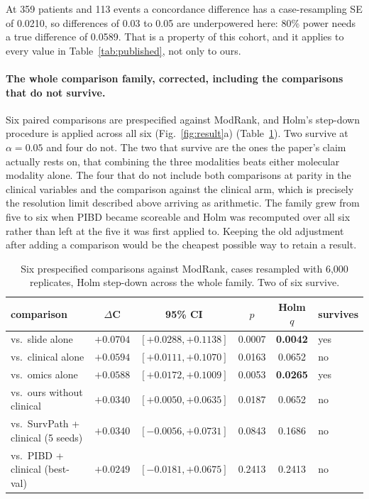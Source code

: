 \documentclass[unnumsec,webpdf,contemporary,large]{oup-authoring-template}
\begin{document}
At 359 patients and 113 events a concordance difference has a case-resampling SE of 0.0210, so
differences of 0.03 to 0.05 are underpowered here: 80\% power needs a true difference of 0.0589.
That is a property of this cohort, and it applies to every value in Table~\ref{tab:published},
not only to ours.

\paragraph{The whole comparison family, corrected, including the comparisons that do not survive.}
Six paired comparisons are prespecified against ModRank, and Holm's step-down procedure is applied
across all six (Fig.~\ref{fig:result}a) (Table~\ref{tab:holm}). Two survive at $\alpha=0.05$ and four do not. The
two that survive are the ones the paper's claim actually rests on, that combining the three
modalities beats either molecular modality alone. The four that do not include both comparisons at
parity in the clinical variables and the comparison against the clinical arm, which is precisely the resolution limit
described above arriving as arithmetic. The family grew from five to six when PIBD became scoreable
and Holm was recomputed over all six rather than left at the five it was first applied to. Keeping the old adjustment after adding a comparison would be the cheapest possible way to retain a result.

\begin{table}[t]
\centering
\caption{Six prespecified comparisons against ModRank, cases resampled with 6{,}000 replicates,
Holm step-down across the whole family. Two of six survive.}
\label{tab:holm}
{\small
\begin{tabular}{lccccl}
\toprule
comparison & $\Delta$C & 95\% CI & $p$ & Holm $q$ & survives \\
\midrule
vs.\ slide alone                  & $+0.0704$ & $[+0.0288, +0.1138]$ & 0.0007 & \textbf{0.0042} & yes \\
vs.\ clinical alone               & $+0.0594$ & $[+0.0111, +0.1070]$ & 0.0163 & 0.0652 & no \\
vs.\ omics alone                  & $+0.0588$ & $[+0.0172, +0.1009]$ & 0.0053 & \textbf{0.0265} & yes \\
vs.\ ours without clinical        & $+0.0340$ & $[+0.0050, +0.0635]$ & 0.0187 & 0.0652 & no \\
vs.\ SurvPath + clinical (5 seeds) & $+0.0340$ & $[-0.0056, +0.0731]$ & 0.0843 & 0.1686 & no \\
vs.\ PIBD + clinical (best-val)   & $+0.0249$ & $[-0.0181, +0.0675]$ & 0.2413 & 0.2413 & no \\
\bottomrule
\end{tabular}}
\end{table}
\end{document}
